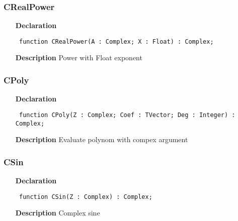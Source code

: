 \documentclass[12pt,a4paper,oneside]{report}
\newcommand{\declarationitem}[1]{\textbf{#1}}
\newcommand{\descriptiontitle}[1]{\textbf{#1}}
\newcommand{\code}[1]{\texttt{#1}}
\begin{document}
\subsubsection{CRealPower}
\label{ucomplex-CRealPower}
\begin{itemize}\item[\declarationitem{Declaration}\hfill]
\begin{flushleft}
\code{
function CRealPower(A : Complex; X : Float) : Complex;}

\end{flushleft}

\par
\item[\descriptiontitle{Description}]
Power with Float exponent

\end{itemize}
\subsubsection{CPoly}
\label{ucomplex-CPoly}
\begin{itemize}\item[\declarationitem{Declaration}\hfill]
\begin{flushleft}
\code{
function CPoly(Z : Complex; Coef : TVector; Deg : Integer) : Complex;}

\end{flushleft}

\par
\item[\descriptiontitle{Description}]
Evaluate polynom with compex argument

\end{itemize}
\subsubsection{CSin}
\label{ucomplex-CSin}
\begin{itemize}\item[\declarationitem{Declaration}\hfill]
\begin{flushleft}
\code{
function CSin(Z : Complex) : Complex;}

\end{flushleft}

\par
\item[\descriptiontitle{Description}]
Complex sine

\end{itemize}
\end{document}
